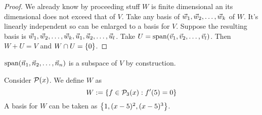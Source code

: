 \begin{proof}
    We already know by proceeding stuff $W$ is finite dimensional an its dimensional does not exceed that of $V$. Take any basis of ${\vec w}_1,{\vec w}_2, \ldots, {\vec w}_{k}$ of $W$. It's linearly independent so can be enlarged to a basis for $V$. Suppose the resulting basis is ${\vec w}_1,{\vec w}_2, \ldots, {\vec w}_{k}, {\vec u}_1,{\vec u}_2, \ldots, {\vec u}_{l}$. Take $U = \text{span} ({\vec v}_1,{\vec v}_2, \ldots, {\vec v}_{l})$. Then $W + U = V$ and $W \cap U = \left\{ 0 \right\}$. 
\end{proof}
\begin{remark}
    $\text{span} ({\vec n}_1,{\vec n}_2, \ldots, {\vec n}_{n})$ is a subspace of $V$ by construction.
\end{remark}
\begin{example}
    Consider $\mathcal P(x)$. We define $W$ as
    \[ W:= \left\{ f \in \mathcal P_3(x) : f'(5) = 0 \right\}\]
    A basis for $W$ can be taken as $\left\{ 1, (x - 5)^2, (x-5)^3 \right\}$.
\end{example}

